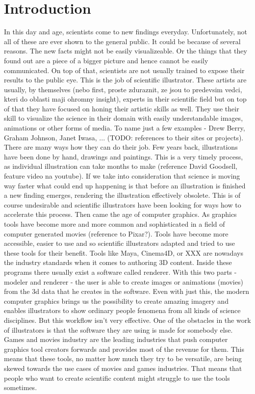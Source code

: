 \documentclass[
  digital, %
  table,   %
  lof,     %
  lot,     %
]{fithesis3}
\begin{document}
\chapter{Introduction}
In this day and age, scientists come to new findings everyday. Unfortunately, not all of these are ever shown to the general public. It could be because of several reasons. The new facts might not be easily visualizeable. Or the things that they found out are a piece of a bigger picture and hence cannot be easily communicated. On top of that, scientists are not usually trained to expose their results to the public eye.
This is the job of scientific illustrator. These artists are usually, by themselves (nebo first, proste zduraznit, ze jsou to predevsim vedci, kteri do oblasti maji ohromny insight), experts in their scientific field but on top of that they have focused on honing their artistic skills as well. They use their skill to visualize the science in their domain with easily understandable images, animations or other forms of media. To name just a few examples - Drew Berry, Graham Johnson, Janet Iwasa, ... (TODO: references to their sites or projects).
There are many ways how they can do their job. Few years back, illustrations have been done by hand, drawings and paintings. This is a very timely process, as individual illustration can take months to make (reference David Goodsell, feature video na youtube). If we take into consideration that science is moving way faster what could end up happening is that before an illustration is finished a new finding emerges, rendering the illustration effectively obsolete. This is of course undesirable and scientific illustrators have been looking for ways how to accelerate this process.
Then came the age of computer graphics. As graphics tools have become more and more common and sophisticated in a field of computer generated movies (reference to Pixar?). Tools have become more accessible, easier to use and so scientific illustrators adapted and tried to use these tools for their benefit. Tools like Maya, Cinema4D, or XXX are nowadays the industry standards when it comes to authoring 3D content. Inside these programs there usually exist a software called renderer. With this two parts - modeler and renderer - the user is able to create images or animations (movies) from the 3d data that he creates in the software.
Even with just this, the modern computer graphics brings us the possibility to create amazing imagery and enables illustrators to show ordinary people fenomena from all kinds of science disciplines.
But this workflow isn't very effective. One of the obstacles in the work of illustrators is that the software they are using is made for somebody else. Games and movies industry are the leading industries that push computer graphics tool creators forwards and provides most of the revenue for them. This means that these tools, no matter how much they try to be versatile, are being skewed towards the use cases of movies and games industries. That means that people who want to create scientific content might struggle to use the tools sometimes.
\end{document}

